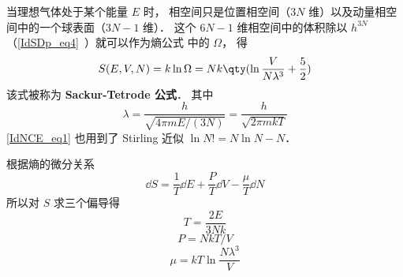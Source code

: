 
\begin{issues}
\issueDraft
\end{issues}


当理想气体处于某个能量 $E$ 时， 相空间只是位置相空间（$3N$ 维）以及动量相空间中的一个球表面（$3N-1$ 维）． 这个 $6N - 1$ 维相空间中的体积除以 $h^{3N}$ （\autoref{IdSDp_eq4}~）就可以作为熵公式%
中的 $\Omega$， 得
\begin{equation}\label{IdNCE_eq1}
S(E, V, N) = k\ln \Omega  = Nk \qty(\ln \frac{V}{N\lambda^3} + \frac52)
\end{equation}
该式被称为 \textbf{Sackur-Tetrode 公式}． 其中
\begin{equation}\label{IdNCE_eq2}
\lambda = \frac{h}{\sqrt{4\pi mE/(3N)}} = \frac{h}{\sqrt{2\pi mkT}}
\end{equation}
\autoref{IdNCE_eq1} 也用到了 Stirling 近似 %
$\ln N! = N\ln N - N$．

根据熵的微分关系 %
\begin{equation}
\dd{S} = \frac{1}{T} \dd{E} + \frac{P}{T} \dd{V} - \frac{\mu}{T} \dd{N}
\end{equation}
所以对 $S$ 求三个偏导得
\begin{equation}
T = \frac{2E}{3Nk}
\end{equation}
\begin{equation}
P = NkT/V
\end{equation}
\begin{equation}
\mu = kT \ln \frac{N\lambda^3}{V}
\end{equation}
